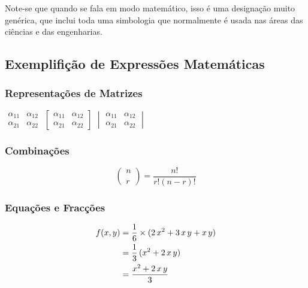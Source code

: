 \documentclass[a4paper,12pt]{article}
\begin{document}
Note-se que quando se fala em modo matemático, isso é uma designação
muito genérica, que inclui toda uma simbologia que
normalmente é usada nas áreas das ciências e das engenharias.

\subsection{Exemplifição de Expressões Matemáticas}

\subsubsection{Representações de Matrizes}

\begin{center}
$\begin{matrix}
\alpha_{11} & \alpha_{12}\\
\alpha_{21} & \alpha_{22}
\end{matrix}$
\hskip 20mm
$\begin{bmatrix}
\alpha_{11} & \alpha_{12}\\
\alpha_{21} & \alpha_{22}
\end{bmatrix}$
\hskip 20mm
$\begin{vmatrix}
\alpha_{11} & \alpha_{12}\\
\alpha_{21} & \alpha_{22}
\end{vmatrix}$
\end{center}

\subsubsection{Combinações\cite{TUG:2003}}

\[\left(\begin{array}{c} n \\ \\ r \end{array} \right) = 
\frac{n!}{r!(n-r)!}\]

\subsubsection{Equações e Fracções}

\begin{equation}
\begin{split}
f(x,y) & = {1 \over 6} \times (2\,x^2 + 3\,x\,y + x\,y) \\
       & = {1 \over 3}\,(x^2 + 2\,x\,y) \\
       & = {x^2 + 2\,x\,y \over 3}
\end{split}
\end{equation}
\end{document}
